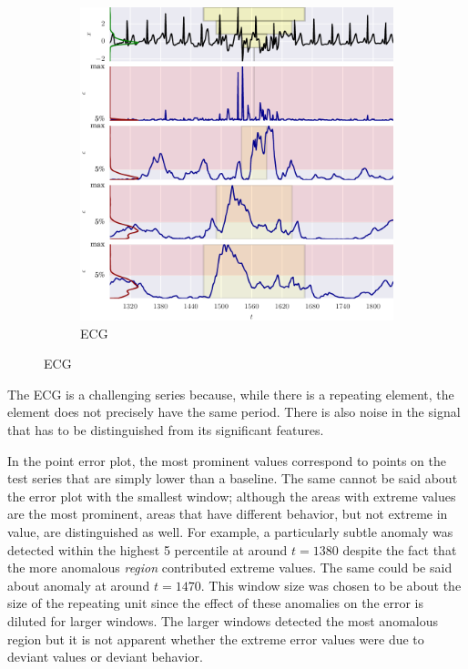 \begin{figure}[!hp]
    \ContinuedFloat 

    \begin{subfigure}[t]{\textwidth} 
        \centering
        \includegraphics[]{figs/er_ecg.pdf}
        \caption{ECG}
    \end{subfigure}%

\end{figure}


The ECG is a challenging series because, while there is a repeating element, the element does not precisely have the same period.
%
There is also noise in the signal that has to be distinguished from its significant features.

In the point error plot, the most prominent values correspond to points on the test series that are simply lower than a baseline.
%
The same cannot be said about the error plot with the smallest window;
%
although the areas with extreme values are the most prominent, areas that have different behavior, but not extreme in value, are distinguished as well.
%
For example, a particularly subtle anomaly was detected within the highest 5 percentile at around $t=1380$ despite the fact that the more anomalous \emph{region} contributed extreme values.
%
The same could be said about anomaly at around $t=1470$.
%
This window size was chosen to be about the size of the repeating unit since the effect of these anomalies on the error is diluted for larger windows.
%
The larger windows detected the most anomalous region but it is not apparent whether the extreme error values were due to deviant values or deviant behavior.


